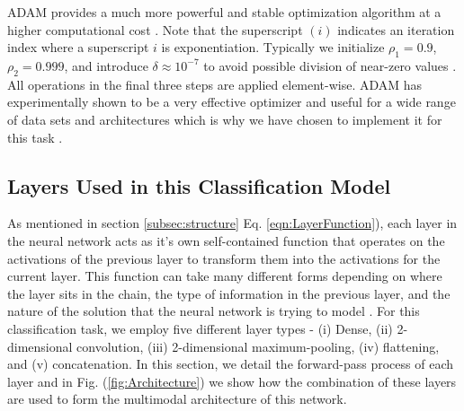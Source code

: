 \documentclass[conference,onecolumn,letterpaper]{IEEEtran}
\begin{document}
ADAM provides a much more powerful and stable optimization algorithm at a higher computational cost \cite{Geron}. Note that the superscript $(i)$ indicates an iteration index where a superscript $i$ is exponentiation. Typically we initialize $\rho_1 = 0.9$, $\rho_2 = 0.999$, and introduce $\delta \approx 10^{-7}$ to avoid possible division of near-zero values \cite{Goodfellow}. All operations in the final three steps are applied element-wise. ADAM has experimentally shown to be a very effective optimizer and useful for a wide range of data sets and architectures which is why we have chosen to implement it for this task \cite{Geron,Goodfellow}.


\subsection{Layers Used in this Classification Model}
\label{sec:LayersUsed}

As mentioned in section \ref{subsec:structure} Eq. \ref{eqn:LayerFunction}), each layer in the neural network acts as it's own self-contained function that operates on the activations of the previous layer to transform them into the activations for the current layer. This function can take many different forms depending on where the layer sits in the chain, the type of information in the previous layer, and the nature of the solution that the neural network is trying to model \cite{Goodfellow,Loy}. For this classification  task, we employ five different layer types - (i) Dense, (ii) 2-dimensional convolution, (iii) 2-dimensional maximum-pooling, (iv) flattening, and (v) concatenation. In this section, we detail the forward-pass process of each layer and in Fig. (\ref{fig:Architecture}) we show how the combination of these layers are used to form the multimodal architecture of this network. 
\end{document}
